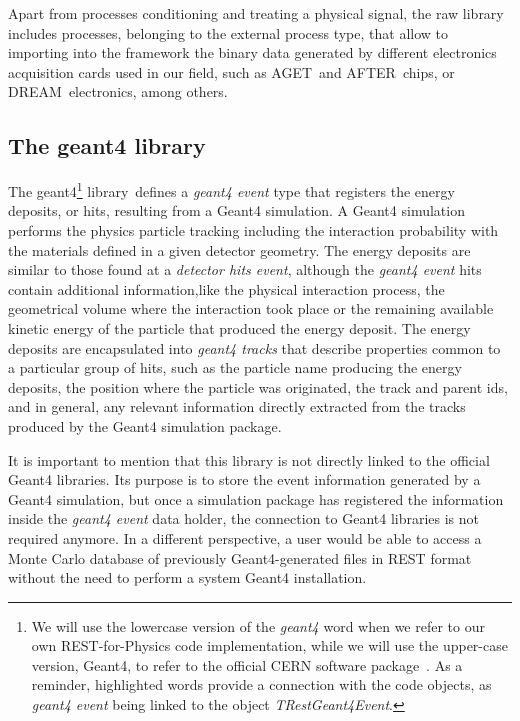 Apart from processes conditioning and treating a physical signal, the raw library includes processes, belonging to the external process type, that allow to importing into the framework the binary data generated by different electronics acquisition cards used in our field, such as AGET\,\cite{6154095} and AFTER\,\cite{Baron:2009sdx} chips, or DREAM\,\cite{Acker2020} electronics, among others.

\subsection{The geant4 library}\label{sc:geant4lib}

The geant4\footnote{We will use the lowercase version of the \emph{geant4} word when we refer to our own REST-for-Physics code implementation, while we will use the upper-case version, Geant4, to refer to the official CERN software package~\cite{Agostinelli:2002hh}. As a reminder, highlighted words provide a connection with the code objects, as \emph{geant4 event} being linked to the object \emph{TRestGeant4Event}.}  library\,\cite{REST_Geant4_Git} defines a \emph{geant4 event} type that registers the energy deposits, or hits, resulting from a Geant4 simulation. A Geant4 simulation performs the physics particle tracking including the interaction probability with the materials defined in a given detector geometry. The energy deposits are similar to those found at a \emph{detector hits event}, although the \emph{geant4 event} hits contain additional information,like the physical interaction process, the geometrical volume where the interaction took place or the remaining available kinetic energy of the particle that produced the energy deposit. The energy deposits are encapsulated into \emph{geant4 tracks} that describe properties common to a particular group of hits, such as the particle name producing the energy deposits, the position where the particle was originated, the track and parent ids, and in general, any relevant information directly extracted from the tracks produced by the Geant4 simulation package.

It is important to mention that this library is not directly linked to the official Geant4 libraries. Its purpose is to store the event information generated by a Geant4 simulation, but once a simulation package has registered the information inside the \emph{geant4 event} data holder, the connection to Geant4 libraries is not required anymore. In a different perspective, a user would be able to access a Monte Carlo database of previously Geant4-generated files in REST format without the need to perform a system Geant4 installation.

